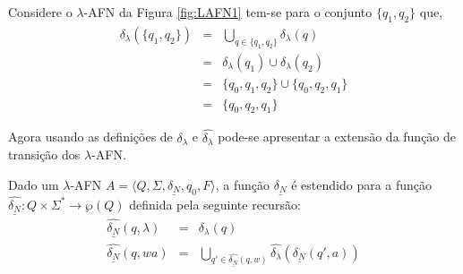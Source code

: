 \begin{exemplo}
	Considere o $\lambda$-AFN da Figura \ref{fig:LAFN1} tem-se para o conjunto $\{q_1, q_2\}$ que,
	\begin{eqnarray*}
		\widehat{\delta_\lambda}(\{q_1, q_2\}) & = & \bigcup_{q \in \{q_1, q_2\}} \delta_\lambda(q)\\
		& = & \delta_\lambda(q_1) \cup \delta_\lambda(q_2)\\
		& = & \{q_0, q_1, q_2\} \cup \{q_0, q_2, q_1\}\\
		& = & \{q_0, q_2, q_1\}
	\end{eqnarray*}
\end{exemplo}

Agora usando as definições de $\delta_\lambda$ e $\widehat{\delta_\lambda}$ pode-se apresentar a extensão da função de transição dos $\lambda$-AFN.

\begin{definicao}\label{def:FuncaoLDeltaNDEstendida}
	Dado um $\lambda$-AFN  $A = \langle Q, \Sigma, \underline{\delta_N}, q_0, F\rangle$, a função $\underline{\delta_N}$ é estendido para a função $\widehat{\underline{\delta_N}}: Q \times \Sigma^* \rightarrow \wp(Q)$ definida pela seguinte recursão:
	\begin{eqnarray}\label{eq:FuncaoLDeltaNDEstendida}
		\widehat{\underline{\delta_N}}(q, \lambda)& = &  \delta_\lambda(q)\\
		\widehat{\underline{\delta_N}}(q, wa) & = & \bigcup_{q' \in \widehat{\underline{\delta_N}}(q, w)} \widehat{\delta_\lambda}(\underline{\delta_N}(q', a))
	\end{eqnarray}
\end{definicao}


